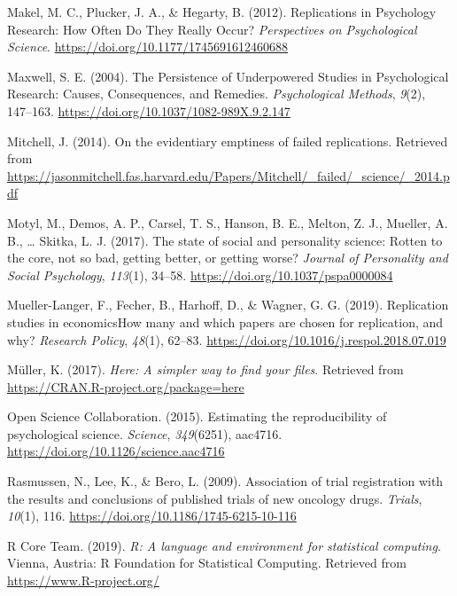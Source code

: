 \documentclass[british,,jou,floatsintext]{apa6}
\begin{document}
\leavevmode\hypertarget{ref-Makel2012}{}%
Makel, M. C., Plucker, J. A., \& Hegarty, B. (2012). Replications in Psychology Research: How Often Do They Really Occur? \emph{Perspectives on Psychological Science}. \url{https://doi.org/10.1177/1745691612460688}

\leavevmode\hypertarget{ref-Maxwell2004}{}%
Maxwell, S. E. (2004). The Persistence of Underpowered Studies in Psychological Research: Causes, Consequences, and Remedies. \emph{Psychological Methods}, \emph{9}(2), 147--163. \url{https://doi.org/10.1037/1082-989X.9.2.147}

\leavevmode\hypertarget{ref-Mitchell2014}{}%
Mitchell, J. (2014). On the evidentiary emptiness of failed replications. Retrieved from \url{https://jasonmitchell.fas.harvard.edu/Papers/Mitchell/_failed/_science/_2014.pdf}

\leavevmode\hypertarget{ref-Motyl2017}{}%
Motyl, M., Demos, A. P., Carsel, T. S., Hanson, B. E., Melton, Z. J., Mueller, A. B., \ldots{} Skitka, L. J. (2017). The state of social and personality science: Rotten to the core, not so bad, getting better, or getting worse? \emph{Journal of Personality and Social Psychology}, \emph{113}(1), 34--58. \url{https://doi.org/10.1037/pspa0000084}

\leavevmode\hypertarget{ref-Mueller-Langer2019}{}%
Mueller-Langer, F., Fecher, B., Harhoff, D., \& Wagner, G. G. (2019). Replication studies in economicsHow many and which papers are chosen for replication, and why? \emph{Research Policy}, \emph{48}(1), 62--83. \url{https://doi.org/10.1016/j.respol.2018.07.019}

\leavevmode\hypertarget{ref-R-here}{}%
Müller, K. (2017). \emph{Here: A simpler way to find your files}. Retrieved from \url{https://CRAN.R-project.org/package=here}

\leavevmode\hypertarget{ref-OSC2015}{}%
Open Science Collaboration. (2015). Estimating the reproducibility of psychological science. \emph{Science}, \emph{349}(6251), aac4716. \url{https://doi.org/10.1126/science.aac4716}

\leavevmode\hypertarget{ref-Rasmussen2009}{}%
Rasmussen, N., Lee, K., \& Bero, L. (2009). Association of trial registration with the results and conclusions of published trials of new oncology drugs. \emph{Trials}, \emph{10}(1), 116. \url{https://doi.org/10.1186/1745-6215-10-116}

\leavevmode\hypertarget{ref-R-base}{}%
R Core Team. (2019). \emph{R: A language and environment for statistical computing}. Vienna, Austria: R Foundation for Statistical Computing. Retrieved from \url{https://www.R-project.org/}
\end{document}
